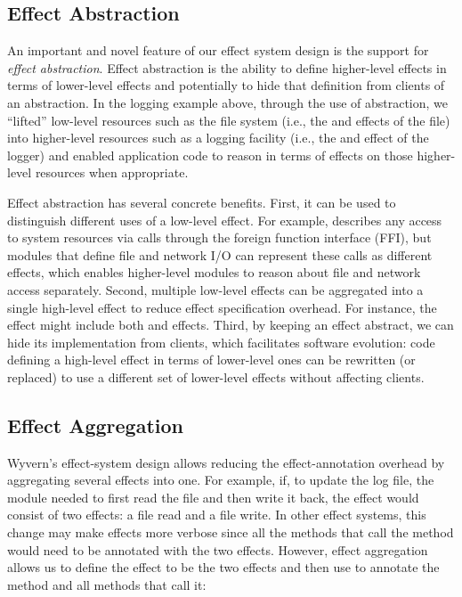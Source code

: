 \subsection{Effect Abstraction}
\label{sec:effect-abstraction}

An important and novel feature of our effect system design is the support for \textit{effect abstraction}. Effect abstraction is the ability to define higher-level effects in terms of lower-level effects and potentially to hide that definition from clients of an abstraction. In the logging example above, through the use of abstraction, we ``lifted'' low-level resources such as the file system (i.e., the  and  effects of the file) into higher-level resources such as a logging facility (i.e., the  and  effect of the logger) and enabled application code to reason in terms of effects on those higher-level resources when appropriate.

Effect abstraction has several concrete benefits. First, it can be used to distinguish different uses of a low-level effect. For example,  describes any access to system resources via calls through the foreign function interface (FFI), but modules that define file and network I/O can represent these calls as different effects, which enables higher-level modules to reason about file and network access separately. Second, multiple low-level effects can be aggregated into a single high-level effect to reduce effect specification overhead. For instance, the  effect might include both  and  effects. Third, by keeping an effect abstract, we can hide its implementation from clients, which facilitates software evolution: code defining a high-level effect in terms of lower-level ones can be rewritten (or replaced) to use a different set of lower-level effects without affecting clients.


\subsection{Effect Aggregation}
\label{sec:effect-aggregation}

Wyvern's effect-system design allows reducing the effect-annotation overhead by aggregating several effects into one. For example, if, to update the log file, the  module needed to first read the file and then write it back, the  effect would consist of two effects: a file read and a file write. In other effect systems, this change may make effects more verbose since all the methods that call the  method would need to be annotated with the two effects. However, effect aggregation allows us to define the  effect to be the two effects and then use  to annotate the  method and all methods that call it:

